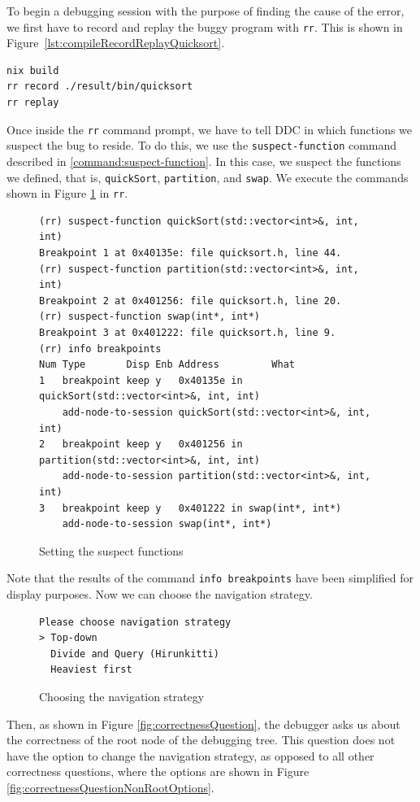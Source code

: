 To begin a debugging session with the purpose of finding the cause of the error, we first have to record and replay the buggy program with \verb|rr|. This is shown in
Figure~\ref{lst:compileRecordReplayQuicksort}.
\begin{lstlisting}[language=bash, caption={Compiling, recording and replaying quickSort}, frame=tb, label={lst:compileRecordReplayQuicksort}]
nix build
rr record ./result/bin/quicksort
rr replay
\end{lstlisting}
Once inside the \verb|rr| command prompt, we have to tell DDC in which functions we suspect the bug to reside.
To do this, we use the \verb|suspect-function| command described in \ref{command:suspect-function}. In this case, we suspect the functions we defined, that is, \verb|quickSort|, \verb|partition|, and \verb|swap|. We execute the commands shown in Figure \ref{fig:suspecting-functions} in \verb|rr|.
\begin{figure}[h]
    \centering
    \caption{Setting the suspect functions}
    \label{fig:suspecting-functions}
    \begin{verbatim}
(rr) suspect-function quickSort(std::vector<int>&, int, int)
Breakpoint 1 at 0x40135e: file quicksort.h, line 44.
(rr) suspect-function partition(std::vector<int>&, int, int)
Breakpoint 2 at 0x401256: file quicksort.h, line 20.
(rr) suspect-function swap(int*, int*)
Breakpoint 3 at 0x401222: file quicksort.h, line 9.
(rr) info breakpoints
Num Type       Disp Enb Address         What
1   breakpoint keep y   0x40135e in quickSort(std::vector<int>&, int, int)
    add-node-to-session quickSort(std::vector<int>&, int, int)
2   breakpoint keep y   0x401256 in partition(std::vector<int>&, int, int)
    add-node-to-session partition(std::vector<int>&, int, int)
3   breakpoint keep y   0x401222 in swap(int*, int*)
    add-node-to-session swap(int*, int*)
    \end{verbatim}
\end{figure}
Note that the results of the command \verb|info breakpoints| have been simplified for display purposes.
Now we can choose the navigation strategy.
\begin{figure}[h]
    \centering
    \caption{Choosing the navigation strategy}
    \label{fig:navigationsStrategyPrompt}
    \begin{verbatim}
Please choose navigation strategy
> Top-down
  Divide and Query (Hirunkitti)
  Heaviest first
    \end{verbatim}
\end{figure}
Then, as shown in Figure \ref{fig:correctnessQuestion}, the debugger asks us about the correctness of the root node of the debugging tree. This question does not have the option to change the navigation strategy, as opposed to all other correctness questions, where the options are shown in Figure \ref{fig:correctnessQuestionNonRootOptions}.

